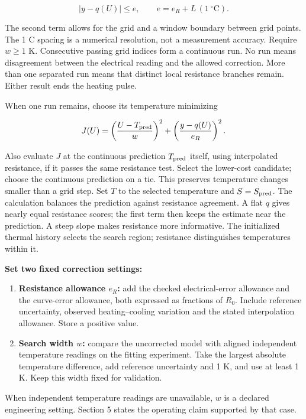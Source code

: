 \documentclass[11pt,letterpaper]{article}
\begin{document}
\[
|y-q(U)|\le e,\qquad e=e_R+L\,(1\ ^\circ\mathrm C).
\]

The second term allows for the grid and a window boundary between grid points. The 1 \textdegree{}C spacing is a numerical resolution, not a measurement accuracy. Require \(w\ge1\) K. Consecutive passing grid indices form a continuous run. No run means disagreement between the electrical reading and the allowed correction. More than one separated run means that distinct local resistance branches remain. Either result ends the heating pulse.

When one run remains, choose its temperature minimizing

\[
J(U)=\left(\frac{U-T_{\rm pred}}{w}\right)^2+
\left(\frac{y-q(U)}{e_R}\right)^2.
\]

Also evaluate \(J\) at the continuous prediction \(T_{\rm pred}\) itself, using interpolated resistance, if it passes the same resistance test. Select the lower-cost candidate; choose the continuous prediction on a tie. This preserves temperature changes smaller than a grid step. Set \(T\) to the selected temperature and \(S=S_{\rm pred}\). The calculation balances the prediction against resistance agreement. A flat \(q\) gives nearly equal resistance scores; the first term then keeps the estimate near the prediction. A steep slope makes resistance more informative. The initialized thermal history selects the search region; resistance distinguishes temperatures within it.

\textbf{Set two fixed correction settings:}

\begin{enumerate}[start=1]
\item \textbf{Resistance allowance \(e_R\):} add the checked electrical-error allowance and the curve-error allowance, both expressed as fractions of \(R_0\). Include reference uncertainty, observed heating--cooling variation and the stated interpolation allowance. Store a positive value.
\item \textbf{Search width \(w\):} compare the uncorrected model with aligned independent temperature readings on the fitting experiment. Take the largest absolute temperature difference, add reference uncertainty and 1 K, and use at least 1 K. Keep this width fixed for validation.
\end{enumerate}

When independent temperature readings are unavailable, \(w\) is a declared engineering setting. Section 5 states the operating claim supported by that case.
\end{document}
